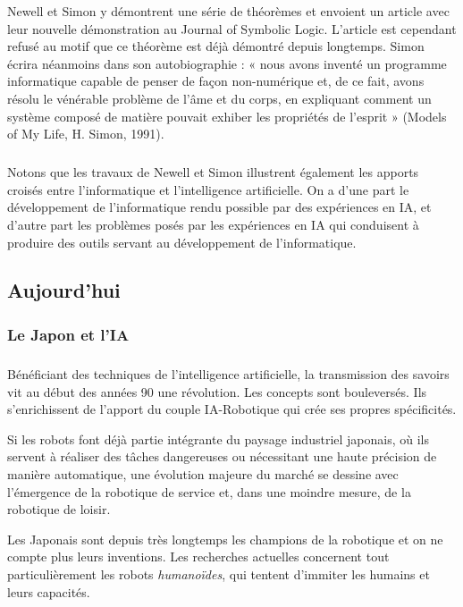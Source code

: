 Newell et Simon y démontrent une série de théorèmes et envoient un article avec leur nouvelle démonstration au Journal of Symbolic Logic. L'article est cependant refusé au motif que ce théorème est déjà démontré depuis longtemps. Simon écrira néanmoins dans son autobiographie : « nous avons inventé un programme informatique capable de penser de façon non-numérique et, de ce fait, avons résolu le vénérable problème de l'âme et du corps, en expliquant comment un système composé de matière pouvait exhiber les propriétés de l'esprit » (Models of My Life, H.
Simon, 1991).

\subparagraph{}
Notons que les travaux de Newell et Simon illustrent également les apports croisés entre l'informatique et l'intelligence artificielle. On a d'une part le développement de l'informatique rendu possible par des expériences en IA, et d'autre part les problèmes posés par les expériences en IA qui conduisent à produire des outils servant au développement de l'informatique.

\subsection{Aujourd'hui}

\subsubsection{Le Japon et l'IA}

\subparagraph{}
Bénéficiant des techniques de l'intelligence artificielle, la transmission des savoirs vit au début des années 90 une révolution. Les concepts sont bouleversés. Ils s'enrichissent de l'apport du couple IA-Robotique qui crée ses propres spécificités.

Si les robots font déjà partie intégrante du paysage industriel japonais, où ils servent à réaliser des tâches dangereuses ou nécessitant une haute précision de manière automatique, une évolution majeure du marché se dessine avec l’émergence de la robotique de service et, dans une moindre mesure, de la robotique de loisir.

Les Japonais sont depuis très longtemps les champions de la robotique et on ne compte plus leurs inventions. Les recherches actuelles concernent tout particulièrement les robots \textit{humanoïdes}, qui tentent d’immiter les humains et leurs capacités.

